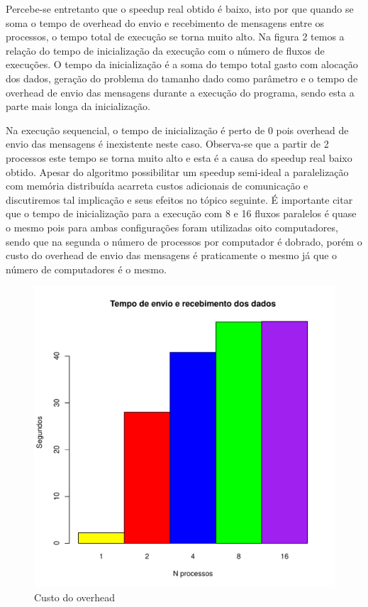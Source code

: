 \documentclass[12pt]{article}
\begin{document}
Percebe-se entretanto que o speedup real obtido é baixo, isto por que quando se soma o tempo de overhead do envio e recebimento de mensagens entre os processos, o tempo total de execução se torna muito alto. Na figura 2 temos a relação do tempo de inicialização da execução com o número de fluxos de execuções. O tempo da inicialização é a soma do tempo total gasto com alocação dos dados, geração do problema do tamanho dado como parâmetro e o tempo de overhead de envio das mensagens durante a execução do programa, sendo esta a parte mais longa da inicialização.

Na execução sequencial, o tempo de inicialização é perto de 0 pois overhead de envio das mensagens é inexistente neste caso. Observa-se que a partir de 2 processos este tempo se torna muito alto e esta é a causa do speedup real baixo obtido. Apesar do algoritmo possibilitar um speedup semi-ideal a paralelização com memória distribuída acarreta custos adicionais de comunicação e discutiremos tal implicação e seus efeitos no tópico seguinte. É importante citar que o tempo de inicialização para a execução com 8 e 16 fluxos paralelos é quase o mesmo pois para ambas configurações foram utilizadas oito computadores, sendo que na segunda o número de processos por computador é dobrado, porém o custo do overhead de envio das mensagens é praticamente o mesmo já que o número de computadores é o mesmo.

\begin{figure}[ht!]
\centering
\includegraphics[width=.6\textwidth]{msgs.pdf}
\caption{Custo do overhead}
\label{fig:custooverhead}
\end{figure}
\end{document}
